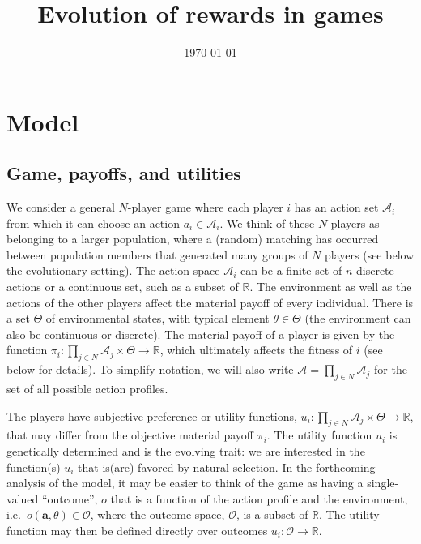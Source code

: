\documentclass[11pt,reqno]{amsart}
\title[Preferences and learning]{Evolution of rewards in games}
\date{\today}
\newcommand{\e}{\theta} %
\newcommand{\Et}{\Theta} %
\newcommand{\na}{n} %
\newcommand{\ac}{a} %
\newcommand{\Ac}{\mathcal{A}} %
\newcommand{\va}{\mathbf{a}} %
\newcommand{\pay}{\pi} %
\newcommand{\Rn}{\mathds{R}} %
\newcommand{\np}{N}%
\newcommand{\om}{o} %
\newcommand{\Om}{\mathcal{O}} %
\newcommand{\pf}{u} %
\begin{document}
\maketitle







\section{Model}


\subsection{Game, payoffs, and utilities}


We consider a general $\np$-player game where each player $i$ has an action set $\Ac_i$ from which it can choose an action $\ac_i \in \Ac_i$. We think of these $\np$ players as belonging to a larger population, where a (random) matching has occurred between population members that generated many groups of $\np$ players (see below the evolutionary setting). The action space $\Ac_i$ can be a finite set of $\na$ discrete actions or a continuous set, such as a subset of $\Rn$. The environment as well as the actions of the other players affect the material payoff of every individual. There is a set $\Et$ of environmental states, with typical element $\e\in\Et$ (the environment can also be continuous or discrete). The material payoff of a player is given by the function $\pay_i : \prod_{j\in \np} \Ac_j \times \Et  \to \Rn$, which ultimately affects the fitness of $i$ (see below for details). To simplify notation, we will also write $\Ac = \prod_{j\in \np} \Ac_j$ for the set of all possible action profiles.

The players have subjective preference or utility functions, $\pf_i : \prod_{j\in \np} \Ac_j \times \Et  \to \Rn$, that may differ from the objective material payoff $\pay_i$. The utility function $\pf_i$ is genetically determined and is the evolving trait: we are interested in the function(s) $\pf_i$ that is(are) favored by natural selection. In the forthcoming analysis of the model, it may be easier to think of the game as having a single-valued ``outcome'', $\om$ that is a function of the action profile and the environment, i.e.~$\om(\va,\e)\in \Om$, where the outcome space, $\Om$, is a subset of $\Rn$. The utility function may then be defined directly over outcomes $\pf_i : \Om  \to \Rn$.
\end{document}
